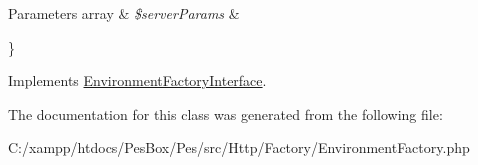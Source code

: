 \begin{DoxyParams}[1]{Parameters}
array & {\em \$server\+Params} & \\
\hline
\end{DoxyParams}
\} 

Implements \mbox{\hyperlink{interface_pes_1_1_http_1_1_factory_1_1_environment_factory_interface_aaf064f4cfd8fa6ba2e87755aa7f03b26}{Environment\+Factory\+Interface}}.



The documentation for this class was generated from the following file\+:\begin{DoxyCompactItemize}
\item 
C\+:/xampp/htdocs/\+Pes\+Box/\+Pes/src/\+Http/\+Factory/Environment\+Factory.\+php\end{DoxyCompactItemize}

